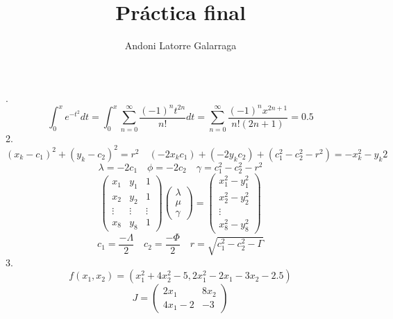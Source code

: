 \documentclass{article}
\title{Práctica final}
\author{Andoni Latorre Galarraga}
\date{}
\begin{document}
\maketitle
{}.
$$
\int_0^x e^{-t^2}dt = \int_0^x \sum_{n=0}^\infty \frac{(-1)^n t^{2n}}{n!}dt=\sum_{n=0}^\infty \frac{(-1)^n x^{2n+1}}{n!(2n+1)}=0.5
$$
2.
$$
(x_k-c_1)^2 + (y_k-c_2)^2= r^2 \quad (-2x_kc_1)+(-2y_kc_2)+(c_1^2-c_2^2-r^2) = -x_k^2 -y_k2
$$
$$
\lambda = -2c_1 \quad \phi = -2c_2 \quad \gamma = c_1^2-c_2^2-r^2
$$
$$
\left(\begin{array}{ccc}
    x_1 & y_1 & 1 \\
    x_2 & y_2 & 1 \\
    \vdots & \vdots & \vdots \\
    x_8 & y_8 & 1
\end{array}\right)
\left(\begin{array}{c}
    \lambda \\
    \mu \\
    \gamma
\end{array}\right)=
\left(\begin{array}{c}
    x_1^2 - y_1^2 \\
    x_2^2- y_2^2 \\
    \vdots \\
    x_8^2 - y_8^2
\end{array}\right)
$$
$$
c_1 = \frac{-\Lambda}{2} \quad c_2 = \frac{-\Phi}{2} \quad r = \sqrt{c_1^2-c_2^2-\Gamma}
$$
3.
$$
f(x_1,x_2)=(x_1^2+4x_2^2-5,2x_1^2-2x_1-3x_2-2.5)
$$
$$
J =
\left(\begin{array}{cc}
    2x_1 & 8x_2 \\
    4x_1-2 & -3
\end{array}\right)
$$
\end{document}
